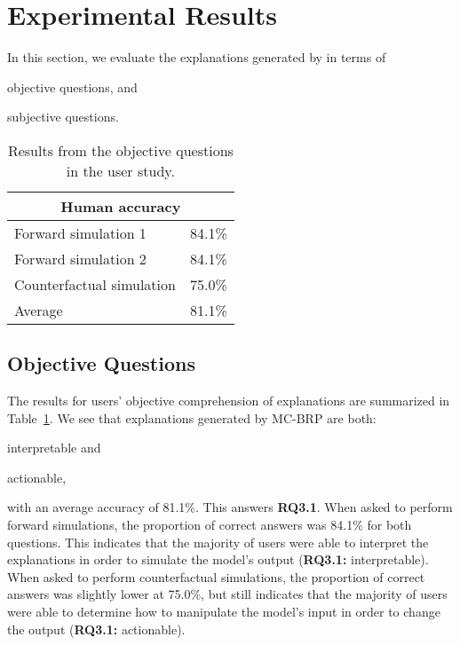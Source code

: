 
\section{Experimental Results}
\label{section:5}
In this section, we evaluate the explanations generated by \OurMethod{} in terms of 
\begin{inparaenum}[(i)]
	\item objective questions, and 
	\item subjective questions. 
\end{inparaenum}

\begin{table}[b]
\caption{Results from the objective questions in the user study.}
\label{table:objective}
\centering
\begin{tabular}{ll}
\toprule
\multicolumn{2}{c}{\textbf{Human accuracy}} \\ 
\midrule
Forward simulation 1         & 84.1\%     \\
Forward simulation 2         & 84.1\%     \\
Counterfactual simulation      & 75.0\%     \\ 
\midrule
Average      & 81.1\% \\
\bottomrule
\end{tabular}
\end{table}


\subsection{Objective Questions}
The results for users' objective comprehension of \OurMethod{} explanations are summarized in Table~\ref{table:objective}. 
We see that explanations generated by MC-BRP are both: 
\begin{inparaenum}[(i)]
\item interpretable and 
\item actionable, 
\end{inparaenum}
with an average accuracy of 81.1\%. 
This answers \textbf{RQ3.1}. 
When asked to perform forward simulations, the proportion of correct answers was 84.1\% for both questions. 
This indicates that the majority of users were able to interpret the explanations in order to simulate the model's output (\textbf{RQ3.1:} interpretable). 
When asked to perform counterfactual simulations, the proportion of correct answers was slightly lower at 75.0\%, but still indicates that the majority of users were able to determine how to manipulate the model's input in order to change the output (\textbf{RQ3.1:} actionable).

